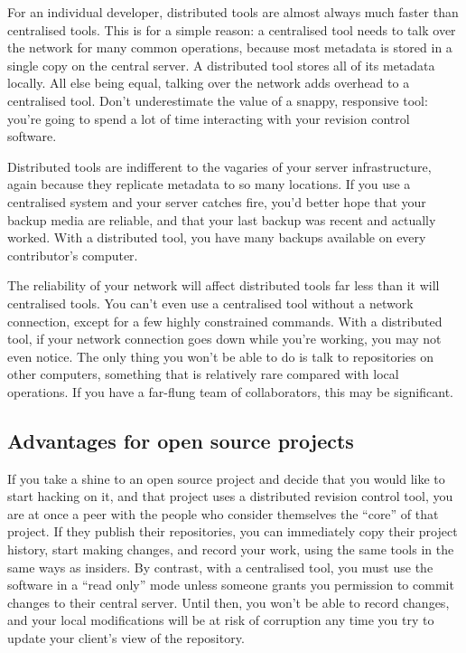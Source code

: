 For an individual developer, distributed tools are almost always much
faster than centralised tools.  This is for a simple reason: a
centralised tool needs to talk over the network for many common
operations, because most metadata is stored in a single copy on the
central server.  A distributed tool stores all of its metadata
locally.  All else being equal, talking over the network adds overhead
to a centralised tool.  Don't underestimate the value of a snappy,
responsive tool: you're going to spend a lot of time interacting with
your revision control software.

Distributed tools are indifferent to the vagaries of your server
infrastructure, again because they replicate metadata to so many
locations.  If you use a centralised system and your server catches
fire, you'd better hope that your backup media are reliable, and that
your last backup was recent and actually worked.  With a distributed
tool, you have many backups available on every contributor's computer.

The reliability of your network will affect distributed tools far less
than it will centralised tools.  You can't even use a centralised tool
without a network connection, except for a few highly constrained
commands.  With a distributed tool, if your network connection goes
down while you're working, you may not even notice.  The only thing
you won't be able to do is talk to repositories on other computers,
something that is relatively rare compared with local operations.  If
you have a far-flung team of collaborators, this may be significant.

\subsection{Advantages for open source projects}

If you take a shine to an open source project and decide that you
would like to start hacking on it, and that project uses a distributed
revision control tool, you are at once a peer with the people who
consider themselves the ``core'' of that project.  If they publish
their repositories, you can immediately copy their project history,
start making changes, and record your work, using the same tools in
the same ways as insiders.  By contrast, with a centralised tool, you
must use the software in a ``read only'' mode unless someone grants
you permission to commit changes to their central server.  Until then,
you won't be able to record changes, and your local modifications will
be at risk of corruption any time you try to update your client's view
of the repository.

